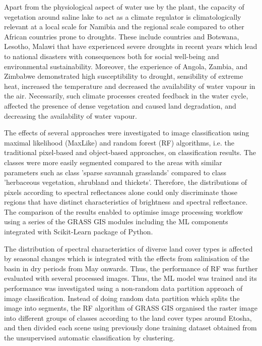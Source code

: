 \documentclass[climate,article,submit,pdftex,moreauthors]{Definitions/mdpi}
\begin{document}
{Apart from the physiological aspect of water use by the plant, the capacity of vegetation around saline lake to act as a climate regulator is climatologically relevant at a local scale for Namibia and the regional scale compared to other African countries prone to droughts. These include countries and Botswana, Lesotho, Malawi that have experienced severe droughts in recent years which lead to national disasters with consequences both for social well-being and environmental sustainability. Moreover, the experience of Angola, Zambia, and Zimbabwe demonstrated  high susceptibility to drought, sensibility of extreme heat, increased the temperature and decreased the availability of water vapour in the air. Necessarily, such climate processes created feedback in the water cycle, affected the presence of dense vegetation and caused land degradation, and decreasing the availability of water vapour. }

{The} effects of several approaches {were investigated }to image classification using maximal likelihood (MaxLike) and random forest (RF) algorithms, i.e. the traditional pixel-based and object-based approaches, on classification results. The classes were more easily segmented compared to the areas with similar parameters such as class 'sparse savannah grasslands' compared to class 'herbaceous vegetation, shrubland and thickets'. Therefore, the distributions of pixels according to spectral reflectances alone could only discriminate those regions that have distinct characteristics of brightness and spectral reflectance. The comparison of the results enabled to optimise image processing workflow using a series of the GRASS GIS modules including the ML components integrated with Scikit-Learn package of Python.

{The distribution} of spectral characteristics of diverse land cover types is affected by seasonal changes which is integrated with the effects from salinisation of the basin in dry periods from May onwards.{ }Thus, the performance of RF was further evaluated with several processed images. Thus, the ML model was trained and its performance was investigated using a non-random data partition approach of image classification. Instead of doing random data partition which splits the image into segments, the RF algorithm of GRASS GIS organised the raster image into different groups of classes according to the land cover types around Etosha, and then divided each scene using previously done training dataset obtained from the unsupervised automatic classification by clustering.
\end{document}
